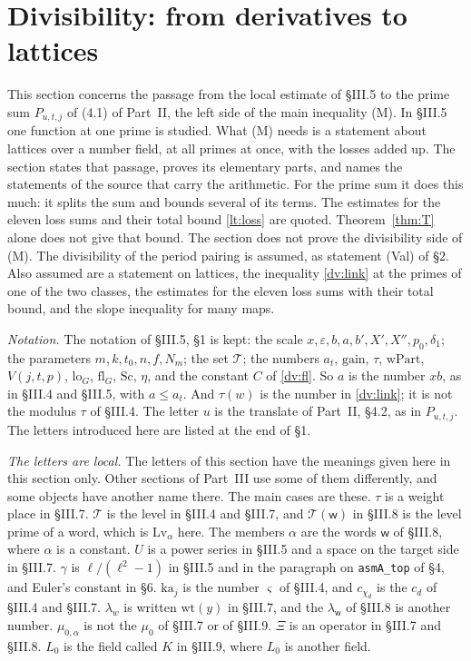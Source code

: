 \documentclass[11pt,letterpaper]{article}
\begin{document}
\section{Divisibility: from derivatives to lattices}\label{lt:sec}

This section concerns the passage from the local estimate of \S III.5 to the prime sum $P_{u,t,j}$ of
(4.1) of Part~II, the left side of the main inequality (M). In \S III.5 one function at one prime is
studied. What (M) needs is a statement about lattices over a number field, at all primes at once, with the
losses added up. The section states that passage, proves its elementary parts, and names the statements of
the source that carry the arithmetic. For the prime sum it does this much: it splits the sum and bounds
several of its terms. The estimates for the eleven loss sums and their total bound \eqref{lt:loss} are
quoted. Theorem~\ref{thm:T} alone does not give that bound. The section does not prove the divisibility
side of (M). The divisibility of
the period pairing is assumed, as statement \textup{(Val)} of \S2. Also assumed are a statement on
lattices, the inequality \eqref{dv:link} at the primes of one of the two classes, the estimates for the
eleven loss sums with their total bound, and the slope inequality for many maps.

\emph{Notation.} The notation of \S III.5, \S1 is kept: the scale $x,\varepsilon,b,a,b',X',X'',p_0,\delta_1$;
the parameters $m,k,t_0,n,f,N_m$; the set $\mathcal T$; the numbers $a_t$, $\mathrm{gain}$, $\tau$,
$\mathrm{wPart}$, $V(j,t,p)$, $\mathrm{lo}_G$, $\mathrm{fl}_G$, $\mathrm{Sc}$, $\eta$, and the constant $C$
of \eqref{dv:fl}. So $a$ is the number $xb$, as in \S III.4 and \S III.5, with $a\le a_t$. And $\tau(w)$ is the number in \eqref{dv:link}; it is not the modulus $\tau$ of \S III.4. The
letter $u$ is the translate of Part~II, \S4.2, as in $P_{u,t,j}$. The letters introduced here are listed at
the end of \S1.

\emph{The letters are local.} The letters of this section have the meanings given here in this section
only. Other sections of Part~III use some of them differently, and some objects have another name there.
The main cases are these. $\tau$ is a weight place in \S III.7. $\mathcal T$ is the level in \S III.4 and
\S III.7, and $\mathcal T(\mathsf w)$ in \S III.8 is the level prime of a word, which is $\mathrm{Lv}_\alpha$
here. The members $\alpha$ are the words $\mathsf w$ of \S III.8, where $\alpha$ is a constant. $U$ is a
power series in \S III.5 and a space on the target side in \S III.7. $\gamma$ is $\ell/(\ell^2-1)$ in
\S III.5 and in the paragraph on \texttt{asmA\_top} of \S4, and Euler's constant in \S6. $\mathrm{ka}_j$ is
the number $\varsigma$ of \S III.4, and $c_{\chi_d}$ is the $c_d$ of \S III.4 and \S III.7. $\lambda_w$ is
written $\mathrm{wt}(y)$ in \S III.7, and the $\lambda_{\mathsf w}$ of \S III.8 is another number.
$\mu_{0,\alpha}$ is not the $\mu_0$ of \S III.7 or of \S III.9. $\Xi$ is an operator in \S III.7 and
\S III.8. $L_0$ is the field called $K$ in \S III.9, where $L_0$ is another field.
\end{document}

